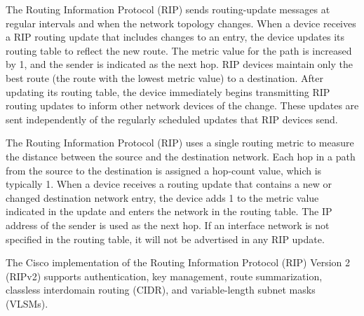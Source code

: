 \documentclass[../EngineeringJournal_CDavis.tex]{subfiles}
\begin{document}

\hspace{0.2cm}
\begin{tcolorbox}[width=6.3in]
\scriptsize
The Routing Information Protocol (RIP) sends routing-update messages at regular intervals and when the network topology changes. When a device receives a RIP routing update that includes changes to an entry, the device updates its routing table to reflect the new route. The metric value for the path is increased by 1, and the sender is indicated as the next hop. RIP devices maintain only the best route (the route with the lowest metric value) to a destination. After updating its routing table, the device immediately begins transmitting RIP routing updates to inform other network devices of the change. These updates are sent independently of the regularly scheduled updates that RIP devices send.
\end{tcolorbox}
\hspace{0.2cm}
\normalsize  


\hspace{0.2cm}
\begin{tcolorbox}[width=6.3in]
\scriptsize
The Routing Information Protocol (RIP) uses a single routing metric to measure the distance between the source and the destination network. Each hop in a path from the source to the destination is assigned a hop-count value, which is typically 1. When a device receives a routing update that contains a new or changed destination network entry, the device adds 1 to the metric value indicated in the update and enters the network in the routing table. The IP address of the sender is used as the next hop. If an interface network is not specified in the routing table, it will not be advertised in any RIP update.
\end{tcolorbox}
\hspace{0.2cm}
\normalsize  


\hspace{0.2cm}
\begin{tcolorbox}[width=6.3in]
\scriptsize
The Cisco implementation of the Routing Information Protocol (RIP) Version 2 (RIPv2) supports authentication, key management, route summarization, classless interdomain routing (CIDR), and variable-length subnet masks (VLSMs).
\end{tcolorbox}
\hspace{0.2cm}
\normalsize  
\end{document}
